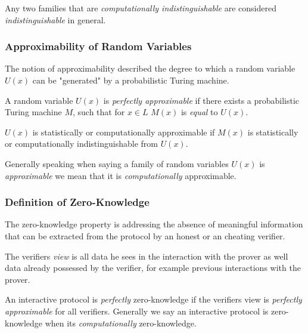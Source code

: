 Any two families that are \textit{computationally indistinguishable} are considered  \textit{indistinguishable} in general.

\subsubsection{Approximability of Random Variables}%

The notion of approximability described the degree to which a random variable $U(x)$ can be "generated" by a probabilistic Turing machine.

\bigskip

A random variable $U(x)$ is \textit{perfectly approximable} if there exists a probabilistic Turing machine $M$, such that for $x \in L$ $M(x)$ is \textit{equal} to $U(x)$.

$U(x)$ is statistically or computationally approximable if $M(x)$ is statistically or computationally indistinguishable from $U(x)$.

\bigskip

Generally speaking when saying a family of random variables $U(x)$ is \textit{approximable} we mean that it is \textit{computationally} approximable.

\subsubsection{Definition of Zero-Knowledge}

The zero-knowledge property is addressing the absence of meaningful information that can be extracted from the protocol by an honest or an cheating verifier.


The verifiers \textit{view} is all data he sees in the interaction with the prover as well data already possessed by the verifier, for example previous interactions with the prover.

\bigskip

An interactive protocol is \textit{perfectly} zero-knowledge if the verifiers view is \textit{perfectly approximable} for all verifiers. Generally we say an interactive protocol is zero-knowledge when its \textit{computationally} zero-knowledge.
